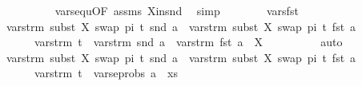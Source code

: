 \begin{isabellebody}
\ \ \ \ \ \ \ \ \isamarkupfalse%
\ vars{\isacharunderscore}{\kern0pt}equ{\isacharbrackleft}{\kern0pt}OF\ assms\ X{\isacharunderscore}{\kern0pt}in{\isacharunderscore}{\kern0pt}snd{\isacharbrackright}{\kern0pt}\ \isamarkupfalse%
\ simp\isanewline
\ \ \ \ \ \ \isamarkupfalse%
\ vars{\isacharunderscore}{\kern0pt}fst\isanewline
\ \ \ \ \ \ \isamarkupfalse%
\ {\isachardoublequoteopen}vars{\isacharunderscore}{\kern0pt}trm\ {\isacharparenleft}{\kern0pt}subst\ {\isacharbrackleft}{\kern0pt}{\isacharparenleft}{\kern0pt}X{\isacharcomma}{\kern0pt}\ swap\ pi\ t{\isacharparenright}{\kern0pt}{\isacharbrackright}{\kern0pt}\ {\isacharparenleft}{\kern0pt}snd\ a{\isacharparenright}{\kern0pt}{\isacharparenright}{\kern0pt}\ {\isasymunion}\ vars{\isacharunderscore}{\kern0pt}trm\ {\isacharparenleft}{\kern0pt}subst\ {\isacharbrackleft}{\kern0pt}{\isacharparenleft}{\kern0pt}X{\isacharcomma}{\kern0pt}\ swap\ pi\ t{\isacharparenright}{\kern0pt}{\isacharbrackright}{\kern0pt}\ {\isacharparenleft}{\kern0pt}fst\ a{\isacharparenright}{\kern0pt}{\isacharparenright}{\kern0pt}\ \ {\isacharequal}{\kern0pt}\ \isanewline
\ \ \ \ \ \ vars{\isacharunderscore}{\kern0pt}trm\ t\ {\isasymunion}\ vars{\isacharunderscore}{\kern0pt}trm\ {\isacharparenleft}{\kern0pt}snd\ a{\isacharparenright}{\kern0pt}\ {\isasymunion}\ vars{\isacharunderscore}{\kern0pt}trm\ {\isacharparenleft}{\kern0pt}fst\ a{\isacharparenright}{\kern0pt}\ {\isacharminus}{\kern0pt}\ {\isacharbraceleft}{\kern0pt}X{\isacharbraceright}{\kern0pt}{\isachardoublequoteclose}\isanewline
\ \ \ \ \ \ \ \ \isamarkupfalse%
\ auto\isanewline
\ \ \ \ \ \ \isamarkupfalse%
\ {\isachardoublequoteopen}vars{\isacharunderscore}{\kern0pt}trm\ {\isacharparenleft}{\kern0pt}subst\ {\isacharbrackleft}{\kern0pt}{\isacharparenleft}{\kern0pt}X{\isacharcomma}{\kern0pt}\ swap\ pi\ t{\isacharparenright}{\kern0pt}{\isacharbrackright}{\kern0pt}\ {\isacharparenleft}{\kern0pt}snd\ a{\isacharparenright}{\kern0pt}{\isacharparenright}{\kern0pt}\ {\isasymunion}\ vars{\isacharunderscore}{\kern0pt}trm\ {\isacharparenleft}{\kern0pt}subst\ {\isacharbrackleft}{\kern0pt}{\isacharparenleft}{\kern0pt}X{\isacharcomma}{\kern0pt}\ swap\ pi\ t{\isacharparenright}{\kern0pt}{\isacharbrackright}{\kern0pt}\ {\isacharparenleft}{\kern0pt}fst\ a{\isacharparenright}{\kern0pt}{\isacharparenright}{\kern0pt}\ {\isasymsubseteq}\ \isanewline
\ \ \ \ \ \ vars{\isacharunderscore}{\kern0pt}trm\ t\ {\isasymunion}\ vars{\isacharunderscore}{\kern0pt}eprobs\ {\isacharparenleft}{\kern0pt}a\ {\isacharhash}{\kern0pt}\ xs{\isacharparenright}{\kern0pt}{\isachardoublequoteclose}\ \isamarkupfalse%

\end{isabellebody}
